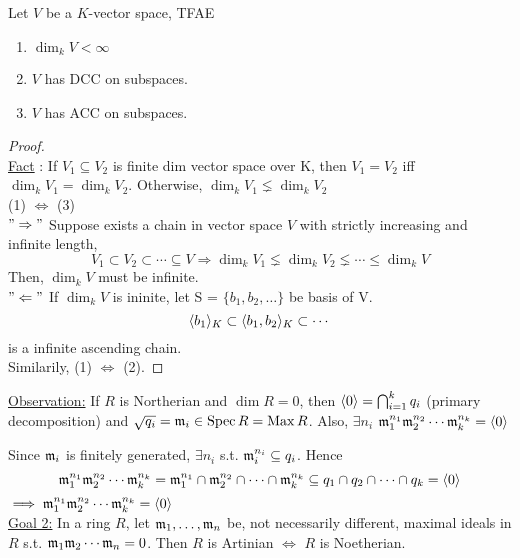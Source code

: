 \begin{lemma} \label{vector-space-dim-acc-dcc-relation}
  Let $V$ be a $K$-vector space, TFAE
  \begin{enumerate}[(1)]
    \item $\dim_k V < \infty$
    \item $V$ has DCC on subspaces.
    \item $V$ has ACC on subspaces.
  \end{enumerate}

  \begin{proof} $ $ \\
    \underline{Fact} : If $V_1 \subseteq V_2$ is finite dim vector space over K, then $V_1 = V_2$
    iff $\dim_k V_1 = \dim_k V_2$. Otherwise, $\dim_k V_1 \lneq \dim_k V_2$\\
    (1) $\Leftrightarrow$ (3) \\
    $"\Rightarrow"$ Suppose exists a chain in vector space $V$ with strictly increasing and infinite
    length,
    $$
      V_1 \subset V_2 \subset \cdots \subseteq V \Rightarrow \dim_k V_1 \lneq \dim_k V_2 \lneq \cdots 
      \leq \dim_k V
    $$
    Then, $\dim_k V$ must be infinite. \\
    $"\Leftarrow"$ If $\dim_k V$ is ininite, let S = $\{b_1, b_2, \dots \}$ be basis of V.
    $$
      \langle b_1\rangle_K \subset \langle b_1 , b_2\rangle_K \subset \cdots
    $$
    is a infinite ascending chain.\\
    Similarily, (1) $\Leftrightarrow$ (2).
  \end{proof}
\end{lemma}

\underline{Observation:} If $R$ is Northerian and $\dim R = 0$, then
$\langle0\rangle = \bigcap_{i=1}^k q_i$ (primary decomposition) and
$\sqrt{q_i} = \mathfrak{m}_i \in \operatorname{Spec} R = \operatorname{Max} R$. Also,  $\exists n_i $ 
$\mathfrak{m}_1^{n_1}\mathfrak{m}_2^{n_2} \dotsm \mathfrak{m}_k^{n_k} = \langle0\rangle$


Since $\mathfrak{m}_i$ is finitely generated, $\exists n_i$ s.t.
$\mathfrak{m}_i^{n_i} \subseteq q_i$. Hence 
$$
\mathfrak{m}_1^{n_1}\mathfrak{m}_2^{n_2} \dotsm \mathfrak{m}_k^{n_k} = 
\mathfrak{m}_1^{n_1} \cap \mathfrak{m}_2^{n_2} \cap \dotsm \cap \mathfrak{m}_k^{n_k} \subseteq
q_1 \cap q_2 \cap \dotsm \cap q_k = \langle0\rangle \\
$$
$\implies \mathfrak{m}_1^{n_1}\mathfrak{m}_2^{n_2} \dotsm \mathfrak{m}_k^{n_k} = \langle0\rangle$ \\

\underline{Goal 2:} In a ring $R$, let $\mathfrak{m}_1, \dots, \mathfrak{m}_n$ be,
not necessarily different, maximal ideals in $R$ s.t.
$\mathfrak{m}_1\mathfrak{m}_2 \dotsm \mathfrak{m}_n = 0$. Then $R$ is Artinian $\iff$ $R$ is Noetherian.

